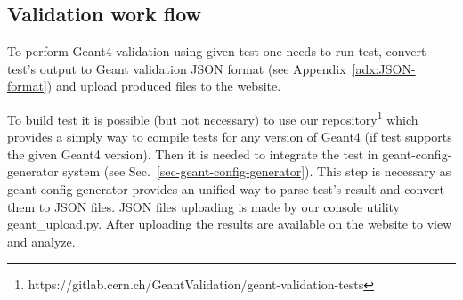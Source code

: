 
%

\subsection{Validation work flow}
\label{sec-workflow}

To perform Geant4 validation using given test one needs to run test, convert test's output to Geant validation JSON format (see Appendix~\ref{adx:JSON-format}) and upload produced files to the website.

To build test it is possible (but not necessary) to use our  repository\footnote{https://gitlab.cern.ch/GeantValidation/geant-validation-tests} which provides a simply way to compile tests for any version of Geant4 (if test supports the given Geant4 version).
Then it is needed to integrate the test in geant-config-generator system (see Sec.~\ref{sec-geant-config-generator}). This step is necessary as geant-config-generator provides an unified way to parse test's result and convert them to JSON files. JSON files uploading is made by our console utility geant\_upload.py. After uploading the results are available on the website to view and analyze.




